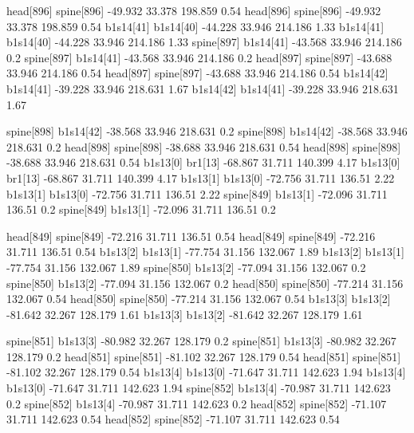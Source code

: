 head[896]    spine[896]    -49.932    33.378    198.859    0.54
head[896]    spine[896]    -49.932    33.378    198.859    0.54
b1s14[41]    b1s14[40]    -44.228    33.946    214.186    1.33
b1s14[41]    b1s14[40]    -44.228    33.946    214.186    1.33
spine[897]    b1s14[41]    -43.568    33.946    214.186    0.2
spine[897]    b1s14[41]    -43.568    33.946    214.186    0.2
head[897]    spine[897]    -43.688    33.946    214.186    0.54
head[897]    spine[897]    -43.688    33.946    214.186    0.54
b1s14[42]    b1s14[41]    -39.228    33.946    218.631    1.67
b1s14[42]    b1s14[41]    -39.228    33.946    218.631    1.67


spine[898]    b1s14[42]    -38.568    33.946    218.631    0.2
spine[898]    b1s14[42]    -38.568    33.946    218.631    0.2
head[898]    spine[898]    -38.688    33.946    218.631    0.54
head[898]    spine[898]    -38.688    33.946    218.631    0.54
b1s13[0]    br1[13]    -68.867    31.711    140.399    4.17
b1s13[0]    br1[13]    -68.867    31.711    140.399    4.17
b1s13[1]    b1s13[0]    -72.756    31.711    136.51    2.22
b1s13[1]    b1s13[0]    -72.756    31.711    136.51    2.22
spine[849]    b1s13[1]    -72.096    31.711    136.51    0.2
spine[849]    b1s13[1]    -72.096    31.711    136.51    0.2


head[849]    spine[849]    -72.216    31.711    136.51    0.54
head[849]    spine[849]    -72.216    31.711    136.51    0.54
b1s13[2]    b1s13[1]    -77.754    31.156    132.067    1.89
b1s13[2]    b1s13[1]    -77.754    31.156    132.067    1.89
spine[850]    b1s13[2]    -77.094    31.156    132.067    0.2
spine[850]    b1s13[2]    -77.094    31.156    132.067    0.2
head[850]    spine[850]    -77.214    31.156    132.067    0.54
head[850]    spine[850]    -77.214    31.156    132.067    0.54
b1s13[3]    b1s13[2]    -81.642    32.267    128.179    1.61
b1s13[3]    b1s13[2]    -81.642    32.267    128.179    1.61


spine[851]    b1s13[3]    -80.982    32.267    128.179    0.2
spine[851]    b1s13[3]    -80.982    32.267    128.179    0.2
head[851]    spine[851]    -81.102    32.267    128.179    0.54
head[851]    spine[851]    -81.102    32.267    128.179    0.54
b1s13[4]    b1s13[0]    -71.647    31.711    142.623    1.94
b1s13[4]    b1s13[0]    -71.647    31.711    142.623    1.94
spine[852]    b1s13[4]    -70.987    31.711    142.623    0.2
spine[852]    b1s13[4]    -70.987    31.711    142.623    0.2
head[852]    spine[852]    -71.107    31.711    142.623    0.54
head[852]    spine[852]    -71.107    31.711    142.623    0.54


